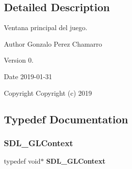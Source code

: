 \subsection{Detailed Description}
Ventana principal del juego. 

\begin{DoxyAuthor}{Author}
Gonzalo Perez Chamarro 
\end{DoxyAuthor}
\begin{DoxyVersion}{Version}
0. 
\end{DoxyVersion}
\begin{DoxyDate}{Date}
2019-\/01-\/31
\end{DoxyDate}
\begin{DoxyCopyright}{Copyright}
Copyright (c) 2019 
\end{DoxyCopyright}


\subsection{Typedef Documentation}
\mbox{\label{_window_8hpp_a0d64dcf67c9685d09cbe051448e1b3f3}} 
\subsubsection{SDL\_GLContext}
{\footnotesize\ttfamily typedef void$\ast$ \textbf{ S\+D\+L\+\_\+\+G\+L\+Context}}

